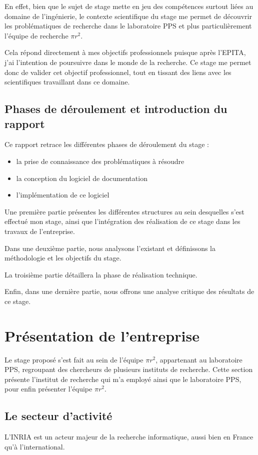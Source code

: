 \documentclass[a4paper, 11pt]{report}
\newcommand{\pir}[0]{\textbf{$\pi r^2$}\xspace}
\newcommand{\epita}[0]{EPITA}
\begin{document}
  En effet, bien que le sujet de stage mette en jeu des compétences surtout
  liées au domaine de l'ingénierie, le contexte scientifique du stage me
  permet de découvrir les problématiques de recherche dans le laboratoire PPS
  et plus particulièrement l'équipe de recherche \pir.

  Cela répond directement à mes objectifs professionnels puisque après l'\epita,
  j'ai l'intention de poursuivre dans le monde de la recherche. Ce stage me
  permet donc de valider cet objectif professionnel, tout en tissant des liens
  avec les scientifiques travaillant dans ce domaine.

  \section{Phases de déroulement et introduction du rapport}
  Ce rapport retrace les différentes phases de déroulement du stage :
  \begin{itemize}
    \item la prise de connaissance des problématiques à résoudre
    \item la conception du logiciel de documentation
    \item l'implémentation de ce logiciel \\
  \end{itemize}

  Une première partie présentes les différentes structures au sein desquelles
  s'est effectué mon stage, ainsi que l'intégration des réalisation de ce stage
  dans les travaux de l'entreprise.

  Dans une deuxième partie, nous analysons l'existant et définissons la méthodologie
  et les objectifs du stage.

  La troisième partie détaillera la phase de réalisation technique.

  Enfin, dans une dernière partie, nous offrons une analyse critique des
  résultats de ce stage.

\chapter{Présentation de l'entreprise}
  Le stage proposé s'est fait au sein de l'équipe \pir, appartenant au
  laboratoire PPS, regroupant des chercheurs de plusieurs instituts de
  recherche. Cette section présente l'institut de recherche qui m'a employé
  ainsi que le laboratoire PPS, pour enfin présenter l'équipe \pir.
  \section{Le secteur d'activité}
  L'INRIA est un acteur majeur de la recherche informatique, aussi bien en
  France qu'à l'international.
\end{document}
